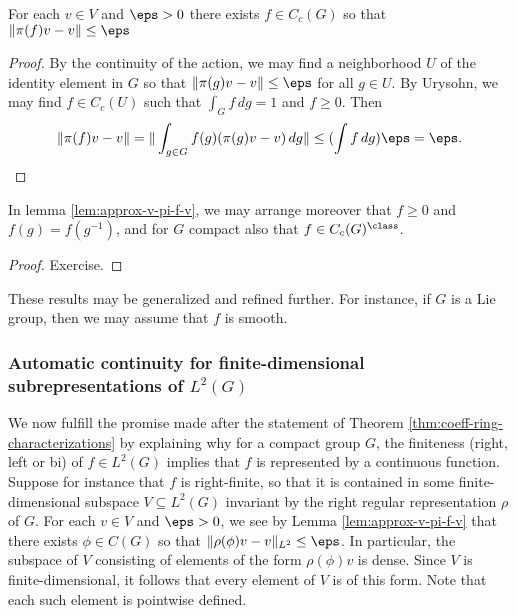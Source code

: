 \documentclass[reqno]{amsart} 
\begin{document}
\begin{lemma}\label{lem:approx-v-pi-f-v}
  For each $v \in V$ and $\eps > 0$ there exists $f \in C_c(G)$ so that $\|\pi(f) v - v\| \leq \eps$
\end{lemma}
\begin{proof}
  By the continuity of the action, we may find a neighborhood $U$ of the identity element in $G$ so that $\|\pi(g) v - v\| \leq \eps$ for all $g \in U$.  By Urysohn, we may find $f \in C_c(U)$ such that $\int_G f \, d g = 1$ and $f \geq 0$.  Then
  \begin{equation*}
    \|\pi(f) v - v\| = \|\int_{g \in G} f(g) (\pi(g) v - v) \, d g\| \leq (\int f \, d g) \eps = \eps.
  \end{equation*}
\end{proof}

\begin{lemma}\label{lem:approx-v-pi-f-v-2}
  In lemma \eqref{lem:approx-v-pi-f-v}, we may arrange moreover that $f \geq 0$ and $f(g) = f(g^{-1})$, and for $G$ compact also that $f \in C_c(G)^{\class}$.
\end{lemma}
\begin{proof}
  Exercise.
\end{proof}

These results may be generalized and refined further.  For instance, if $G$ is a Lie group, then we may assume that $f$ is smooth.


\subsubsection{Automatic continuity for finite-dimensional
  subrepresentations of $L^2(G)$}\label{sec:autom-cont-finite}
We now fulfill the promise made after the statement of Theorem \ref{thm:coeff-ring-characterizations} by explaining why for a compact group $G$, the finiteness (right, left or bi) of $f \in L^2(G)$ implies that $f$ is represented by a continuous function.  Suppose for instance that $f$ is right-finite, so that it is contained in some finite-dimensional subspace $V \subseteq L^2(G)$ invariant by the right regular representation $\rho$ of $G$.  For each $v \in V$ and $\eps > 0$, we see by Lemma \ref{lem:approx-v-pi-f-v} that there exists $\phi \in C(G)$ so that $\|\rho(\phi) v - v\|_{L^2} \leq \eps$.  In particular, the subspace of $V$ consisting of elements of the form $\rho(\phi) v$ is dense.  Since $V$ is finite-dimensional, it follows that every element of $V$ is of this form.  Note that each such element is pointwise defined.
\end{document}
